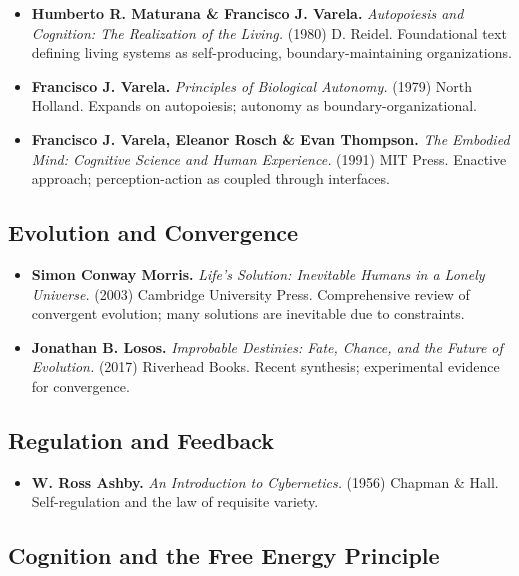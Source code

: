 \documentclass[
  openright]{book}
\providecommand{\tightlist}{%
  \setlength{\itemsep}{0pt}\setlength{\parskip}{0pt}}
\begin{document}
\begin{itemize}
\item
  \textbf{Humberto R. Maturana \& Francisco J. Varela.}
  \emph{Autopoiesis and Cognition: The Realization of the Living.}
  (1980) D. Reidel. Foundational text defining living systems as
  self-producing, boundary-maintaining organizations.
\item
  \textbf{Francisco J. Varela.} \emph{Principles of Biological
  Autonomy.} (1979) North Holland. Expands on autopoiesis; autonomy as
  boundary-organizational.
\item
  \textbf{Francisco J. Varela, Eleanor Rosch \& Evan Thompson.}
  \emph{The Embodied Mind: Cognitive Science and Human Experience.}
  (1991) MIT Press. Enactive approach; perception-action as coupled
  through interfaces.
\end{itemize}

\subsection{Evolution and Convergence}\label{evolution-and-convergence}

\begin{itemize}
\item
  \textbf{Simon Conway Morris.} \emph{Life's Solution: Inevitable Humans
  in a Lonely Universe.} (2003) Cambridge University Press.
  Comprehensive review of convergent evolution; many solutions are
  inevitable due to constraints.
\item
  \textbf{Jonathan B. Losos.} \emph{Improbable Destinies: Fate, Chance,
  and the Future of Evolution.} (2017) Riverhead Books. Recent
  synthesis; experimental evidence for convergence.
\end{itemize}

\subsection{Regulation and Feedback}\label{regulation-and-feedback}

\begin{itemize}
\tightlist
\item
  \textbf{W. Ross Ashby.} \emph{An Introduction to Cybernetics.} (1956)
  Chapman \& Hall. Self-regulation and the law of requisite variety.
\end{itemize}

\subsection{Cognition and the Free Energy
Principle}\label{cognition-and-the-free-energy-principle}
\end{document}
